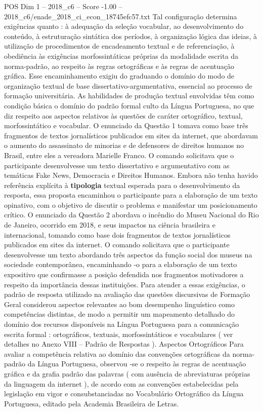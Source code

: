 \begin{textsample}{POS Dim 1 – 2018\_c6 – Score -1.00 – 2018\_c6/enade\_2018\_ci\_econ\_18745efc57.txt}
Tal configuração determina exigências quanto : à adequação da seleção vocabular, ao desenvolvimento do conteúdo, à estruturação sintática dos períodos, à organização lógica das ideias, à utilização de procedimentos de encadeamento textual e de referenciação, à obediência às exigências morfossintáticas próprias da modalidade escrita da norma-padrão, ao respeito às regras ortográficas e às regras de acentuação gráfica.
Esse encaminhamento exigiu do graduando o domínio do modo de organização textual de base dissertativo-argumentativa, essencial ao processo de formação universitária.
As habilidades de produção textual envolvidas têm como condição básica o domínio do padrão formal culto da Língua Portuguesa, no que diz respeito aos aspectos relativos às questões de caráter ortográfico, textual, morfossintático e vocabular.
O enunciado da Questão 1 tomava como base três fragmentos de textos jornalísticos publicados em sites da internet, que abordavam o aumento do assassinato de minorias e de defensores de direitos humanos no Brasil, entre eles a vereadora Marielle Franco.
O comando solicitava que o participante desenvolvesse um texto dissertativo e argumentativo com as temáticas Fake News, Democracia e Direitos Humanos.
Embora não tenha havido referência explícita à \textbf{tipologia} textual esperada para o desenvolvimento da resposta, essa proposta encaminhou o participante para a elaboração de um texto opinativo, com o objetivo de discutir o problema e manifestar um posicionamento crítico.
O enunciado da Questão 2 abordava o incêndio do Museu Nacional do Rio de Janeiro, ocorrido em 2018, e seus impactos na ciência brasileira e internacional, tomando como base dois fragmentos de textos jornalísticos publicados em sites da internet.
O comando solicitava que o participante desenvolvesse um texto abordando três aspectos da função social dos museus na sociedade contemporânea, encaminhando -o para a elaboração de um texto expositivo que confirmasse a posição defendida nos fragmentos motivadores a respeito da importância dessas instituições.
Para atender a essas exigências, o padrão de resposta utilizado na avaliação das questões discursivas de Formação Geral considerou aspectos relevantes ao bom desempenho linguístico como competências distintas, de modo a permitir um mapeamento detalhado do domínio dos recursos disponíveis na Língua Portuguesa para a comunicação escrita formal : ortográficos, textuais, morfossintáticos e vocabulares ( ver detalhes no Anexo VIII – Padrão de Respostas ).
Aspectos Ortográficos Para avaliar a competência relativa ao domínio das convenções ortográficas da norma-padrão da Língua Portuguesa, observou -se o respeito às regras de acentuação gráfica e da grafia padrão das palavras ( com ausência de abreviaturas próprias da linguagem da internet ), de acordo com as convenções estabelecidas pela legislação em vigor e consubstanciadas no Vocabulário Ortográfico da Língua Portuguesa, editado pela Academia Brasileira de Letras.

\end{textsample}
